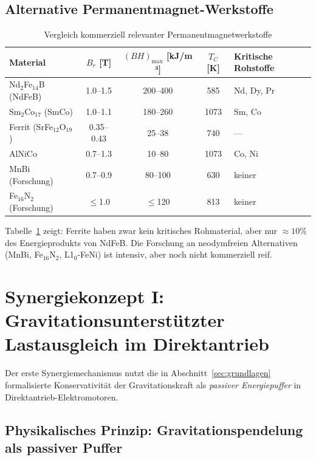 ﻿\documentclass[12pt, a4paper]{report}
\theoremstyle{definition}
\theoremstyle{remark}
\begin{document}
\subsection{Alternative Permanentmagnet-Werkstoffe}

\begin{table}[H]
  \centering
  \caption{Vergleich kommerziell relevanter Permanentmagnetwerkstoffe}
  \label{tab:magnete}
  \begin{tabular}{lcccl}
    \toprule
    \textbf{Material} & $B_r$ [T] & $(BH)_{\max}$ [kJ/m ³] & $T_C$ [K]
    & \textbf{Kritische Rohstoffe} \\
    \midrule
    Nd$_2$Fe$_{14}$B (NdFeB) & 1.0--1.5 & 200--400 & 585 & Nd, Dy, Pr \\
    Sm$_2$Co$_{17}$ (SmCo)   & 1.0--1.1 & 180--260 & 1073 & Sm, Co \\
    Ferrit (SrFe$_{12}$O$_{19}$) & 0.35--0.43 & 25--38 & 740 & --- \\
    AlNiCo                    & 0.7--1.3 & 10--80  & 1073 & Co, Ni \\
    MnBi (Forschung)          & 0.7--0.9 & 80--100 & 630  & keiner \\
    Fe$_{16}$N$_2$ (Forschung) & $\leq$1.0  & $\leq$120 & 813  & keiner \\
    \bottomrule
  \end{tabular}
\end{table}

Tabelle~\ref{tab:magnete} zeigt: Ferrite haben zwar kein kritisches Rohmaterial,
aber nur $\approx 10\%$ des Energieprodukts von NdFeB. Die Forschung an
neodymfreien Alternativen (MnBi, Fe$_{16}$N$_2$, L1$_0$-FeNi) ist intensiv,
aber noch nicht kommerziell reif.

\section{Synergiekonzept I: Gravitationsunterstützter Lastausgleich im
            Direktantrieb}
\label{ssec:synergie1}

Der erste Synergiemechanismus nutzt die in Abschnitt~\ref{sec:grundlagen}
formalisierte Konservativität der Gravitationskraft als \emph{passiver
Energiepuffer} in Direktantrieb-Elektromotoren.

\subsection{Physikalisches Prinzip: Gravitationspendelung als passiver Puffer}
\end{document}
